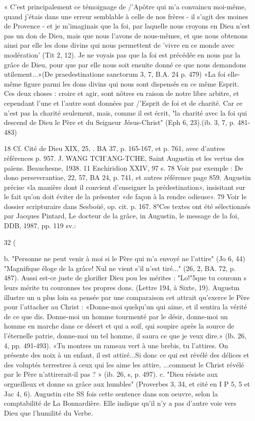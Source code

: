 « C'est principalement ce témoignage de /'Apôtre qui m'a convaincu moi-même, quand j'étais dans une erreur semblable à celle de nos frères - il s'agit des moines de Provence - et je m'imaginais que la foi, par laquelle nous croyons en Dieu n'est pas un don de Dieu, mais que nous l'avons de nous-mêmes, et que nous obtenons ainsi par elle les dons divins qui nous permettent de 'vivre en ce monde avec modération' (Tit 2, 12). Je ne voyais pas que la foi est précédée en nous par la grâce de Dieu, pour que par elle nous soit ensuite donné ce que nous demandons utilement...»(De praedestinatione sanctorum 3, 7, B.A. 24 p. 479)
«La foi elle-même figure parmi les dons divins qui nous sont dispensés en ce même Esprit. Ces deux choses : croire et agir, sont nôtres en raison de notre libre arbitre, et cependant l'une et l'autre sont données par /'Esprit de foi et de charité. Car ce n'est pas la charité seulement, mais, comme il est écrit, "la charité avec la foi qui descend de Dieu le Père et du Seigneur Jésus-Christ" (Eph 6, 23).(ib. 3, 7, p. 481-483)





18 Cf. Cité de Dieu XIX, 25, . BA 37, p. 165-167, et p. 761, avec d'autres références p. 957. J. WANG TCH'ANG-TCHE, Saint Augustin et les vertus des païens. Beauchesne, 1938.
11 Enchiridion XXIV, 97 s.
78 Voir par exemple : De dono perseverantiae, 22, 57, BA 24, p. 741, et autres référence page 859. Augustin précise «la manière dont il convient d'enseigner la prédestination», insisitant sur le fait qu'on doit éviter de la présenter «de façon à la rendre odieuse».
79 Voir le dossier scripturaire dans Sesboüé, op. cit. p. 167.
8°Ces textes ont été sélectionnés par Jacques Pintard, Le docteur de la grâce, in Augustin, le
message de la foi, DDB, 1987, pp. 119 sv.:


32
(
 
b.	"Personne ne peut venir à moi si le Père qui m'a envoyé ne l'attire" (Jo 6, 44) "Magnifique éloge de la grâce! Nul ne vient s'il n'est tiré..." (26, 2, BA. 72, p. 487). Aussi est-ce juste de glorifier Dieu pou les mérites : "Lo!"5que tu couronn s leurs mérite tu couronnes tes propres dons. (Lettre 194, à Sixte, 19). Augustm illustre un u plus loin sa pensée par une comparaison cet attrait qu'exerce le Père
pour l'attacher au Christ :
«Donne-moi quelqu'un qui aime, et il sentira la vérité de ce que dis. Donne-moi un homme tourmenté par le désir, donne-moi un homme en marche dans ce désert et qui a soif, qui soupire après la source de l'éternelle patrie, donne-moi un tel homme, il saura ce que je veux dire.» (lb. 26, 4, pp. 491-493).
«Tu montres  un rameau vert à une brebis, tu l'attires. On présente des noix à
un enfant, il est attiré...Si donc ce qui est révélé des délices et des voluptés terrestres à ceux qui les aime les attire, ...comment le Christ révélé par le Père n'attirerait-il pas ? » (ib. 26, s, p. 497).
c.	"Dieu résiste aux orgueilleux et donne sa grâce aux humbles" (Proverbes 3, 34, et cité en I P 5, 5 et Jac 4, 6). Augustin cite SS fois cette sentence dans son oeuvre, selon la comptabilité de La Bonnardière. Elle indique qu'il n'y a pas d'autre voie vers Dieu que l'humilité du Verbe.

